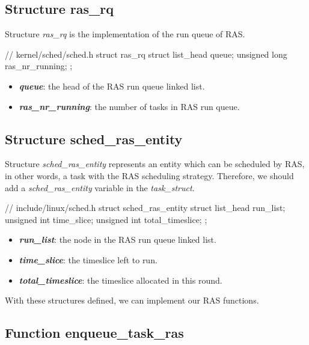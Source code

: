 \subsection{Structure ras\_rq}

Structure \textit{ras\_rq} is the implementation of the run queue of RAS. 

\begin{codeblock}[language=C]
// kernel/sched/sched.h
struct ras_rq 
{
	struct list_head queue;
	unsigned long ras_nr_running;
};
\end{codeblock}

\begin{itemize}
    \item \textbf{\textit{queue}}: the head of the RAS run queue linked list.
    \item \textbf{\textit{ras\_nr\_running}}: the number of tasks in RAS run queue.
\end{itemize}

\subsection{Structure sched\_ras\_entity}

Structure \textit{sched\_ras\_entity} represents an entity which can be scheduled by RAS, in other words, a task with the RAS scheduling strategy. Therefore, we should add a \textit{sched\_ras\_entity} variable in the \textit{task\_struct}.

\begin{codeblock}[language=C]
// include/linux/sched.h
struct sched_ras_entity 
{
	struct list_head run_list;
	unsigned int time_slice;
	unsigned int total_timeslice;
};
\end{codeblock}

\begin{itemize}
    \item \textbf{\textit{run\_list}}: the node in the RAS run queue linked list.
    \item \textbf{\textit{time\_slice}}: the timeslice left to run.
    \item \textbf{\textit{total\_timeslice}}: the timeslice allocated in this round.
\end{itemize}

With these structures defined, we can implement our RAS functions.

\subsection{Function enqueue\_task\_ras}

